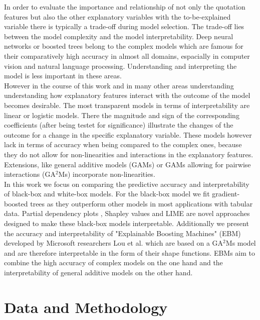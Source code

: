 \documentclass[12pt,titlepage]{article}
\begin{document}
In order to evaluate the importance and relationship of not only the quotation features but also the other explanatory variables with the to-be-explained variable there is typically a trade-off during model selection. The trade-off lies between the model complexity and the model interpretability. Deep neural networks or boosted trees belong to the complex models which are famous for their comparatively high accuracy in almost all domains, espacially in computer vision and natural language processing. Understanding and interpreting the model is less important in these areas. \\ However in the course of this work and in many other areas understanding understanding how explanatory features interact with the outcome of the model becomes desirable. The most transparent models in terms of interpretability are linear or logistic models. There the magnitude and sign of the corresponding coefficients (after being testet for significance) illustrate the changes of the outcome for a change in the specific explanatory variable. These models however lack in terms of accuracy when being compared to the complex ones, because they do not allow for non-linearities and interactions in the explanatory features. Extensions, like general additive models (GAMs) \cite{gam} or GAMs allowing for pairwise interactions (GA$^{2}$Ms) \cite{ga2m} incorporate non-linearities.\\
In this work we focus on comparing the predictive accuracy and interpretability of black-box and white-box models. For the black-box model we fit gradient-boosted trees \cite{gbt} as they outperform other models in most applications with tabular data. Partial dependency plots \cite{pdp}, Shapley values \cite{shap} and LIME \cite{lime} are novel approaches designed to make these black-box models interpretable. Additionally we present the accuracy and interpretability of "Explainable Boosting Machines" (EBM) developed by Microsoft researchers Lou et al. \cite{interpretml} which are based on a GA$^{2}$Ms model and are therefore interpretable in the form of their shape functions. EBMs aim to combine the high accuracy of complex models on the one hand and the interpretability of general additive models on the other hand. \\

\section{Data and Methodology} \par
\end{document}
